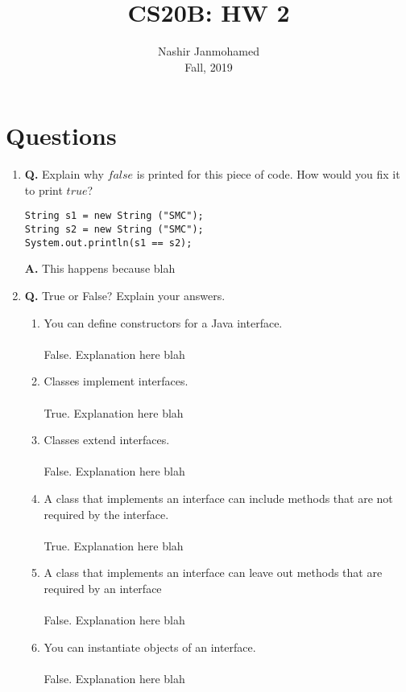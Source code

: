 \documentclass[12pt]{article}
\begin{document}
 
 
\title{CS20B: HW 2}
\author{Nashir Janmohamed\\
Fall, 2019}

\maketitle
\section{Questions}
\begin{enumerate}
  \item
  \textbf{Q.} Explain why $false$ is printed for this piece of code. How would you fix it to print $true$?
  \begin{lstlisting}
String s1 = new String ("SMC");
String s2 = new String ("SMC");
System.out.println(s1 == s2);
  \end{lstlisting}
  \textbf{A.}
  This happens because {\huge blah}
  \item
  \textbf{Q.} True or False? Explain your answers.
  \begin{enumerate}[label=\Alph*]
    \item You can define constructors for a Java interface.
    \\\\
    False. Explanation here {\huge blah}
    \\
    \item Classes implement interfaces.
    \\\\
    True. Explanation here {\huge blah}
    \\
    \item Classes extend interfaces.
    \\\\
    False. Explanation here {\huge blah}
    \\
    \item A class that implements an interface can include methods that are not required by the interface.
    \\\\
    True. Explanation here {\huge blah}
    \\
    \item A class that implements an interface can leave out methods that are required by an interface
    \\\\
    False. Explanation here {\huge blah}
    \\
    \item You can instantiate objects of an interface.
    \\\\
    False. Explanation here {\huge blah}
    \\
  \end{enumerate}
\end{enumerate}

 
\end{document}
